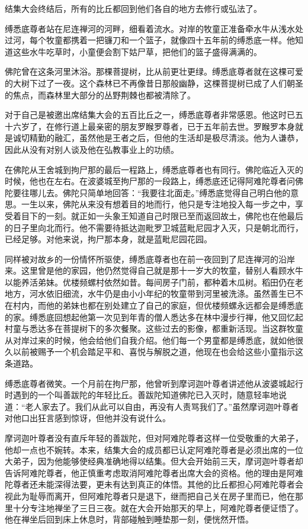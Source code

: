 \documentclass[12pt,twoside,openany]{book}
\begin{document}
结集大会终结后，所有的比丘都回到他们各自的地方去修行或弘法了。

\centerline{\hfill * \hfill * \hfill * \hfill}

缚悉底尊者站在尼连禅河的河畔，细看着流水。对岸的牧童正准备牵水牛从浅水处过河，每个牧童都携着一把镰刀和一个篮子，就像四十五年前的缚悉底一样。他知道这些水牛吃草时，小童便会割下姑尸草，把他们的篮子盛得满满的。

佛陀曾在这条河里沐浴。那棵菩提树，比从前更壮更绿。缚悉底尊者就在这棵可爱的大树下过了一夜。这个森林已不再像昔日那般幽静，这棵菩提树已成了人们朝圣的焦点，而森林里大部分的丛野荆棘也都被清除了。

对于自己是被邀出席结集大会的五百比丘之一，缚悉底尊者非常感恩。他这时已五十六岁了，在修行道上最亲密的朋友罗睺罗尊者，已于五年前去世。罗睺罗本身就是诚切精勤的融汇，虽然他是王者之后，但他的生活却是极尽清淡。他为人谦恭，因此从没有对别人谈及他在弘教事业上的功绩。

在佛陀从王舍城到拘尸那的最后一程路上，缚悉底尊者也有同行。佛陀临近入灭的时候，他也在左右。在波婆城至拘尸那的一段路上，缚悉底还记得阿难陀尊者问佛陀要往哪儿去。佛陀只简单地回答：“我要往北面走。”缚悉底觉得自己明白他的意思。一生以来，佛陀从来没有想着目的地而行，他只是专注地投入每一步之中，享受着目下的一刻。就正如一头象王知道自己时限已至而返回故土，佛陀也在他最后的日子里向北而行。他不需要待抵达迦毗罗卫城蓝毗尼园才入灭，只是朝北而行，已经足够。对他来说，拘尸那本身，就是蓝毗尼园花园。

同样被对故乡的一份情怀所驱使，缚悉底尊者也在前一夜回到了尼连禅河的沿岸来。这里曾是他的家园，他仍然觉得自己就是那十一岁大的牧童，替别人看顾水牛以能养活弟妹。优楼频螺村依然如昔。每间房子门前，都种着木瓜树。稻田仍在老地方，河水依旧细流，水牛仍是由小小年纪的牧童带到河里被洗涤。虽然善生已不在村内，而他的弟妹也都在别处建立了自己的家庭，但优楼频螺永远都会是缚悉底的家。缚悉底回想起他第一次见到年青的僧人悉达多在林中漫步行禅，他又回忆起村童与悉达多在菩提树下的多次餐聚。这些过去的影像，都重新活现。当这群牧童从对岸过来的时候，他会给他们自我介绍。他们每一个男童都是缚悉底，就如他很久以前被赐予一个机会踏足平和、喜悦与解脱之道，他现在也会给这些小童指示这条道路。

缚悉底尊者微笑。一个月前在拘尸那，他曾听到摩诃迦叶尊者讲述他从波婆城起行时遇到的一个叫善跋陀的年轻比丘。善跋陀知道佛陀已入灭时，随意轻率地说道：“老人家去了。我们从此可以自由，再没有人责骂我们了。”虽然摩诃迦叶尊者对他口出狂言感到惊讶，但他并没有说什么。

摩诃迦叶尊者没有直斥年轻的善跋陀，但对阿难陀尊者这样一位受敬重的大弟子，他却一点也不婉转。本来，结集大会的成员都已认定阿难陀尊者是必须出席的一位大弟子，因为他能够使经典准确地得以结集。但大会开始前三天，摩诃迦叶尊者却告诉阿难陀尊者，他正慎重考虑取消阿难陀尊者出席大会的资格。他的理由是阿难陀尊者还未能深得法要，更未有达到真正的体悟。其他的比丘都担心阿难陀尊者会视此为耻辱而离开，但阿难陀尊者只是退下，继而把自己关在房子里而已，他在那里十分专注地禅坐了三日三夜。就在大会开始那天的早上，阿难陀尊者便证悟了。他在禅坐后回到床上休息时，背部碰触到睡垫那一刻，便恍然开悟。
\end{document}
